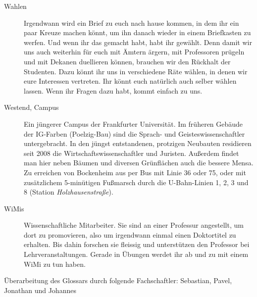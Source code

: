 \begin{description}
\item[Wahlen] Irgendwann wird ein Brief zu euch nach hause kommen, in dem ihr
ein paar Kreuze machen könnt, um ihn danach wieder in einem Briefkasten zu
werfen. Und wenn ihr das gemacht habt, habt ihr gewählt. Denn damit wir uns auch
weiterhin für euch mit Ämtern ärgern, mit Professoren prügeln und mit Dekanen
duellieren können, brauchen wir den Rückhalt der Studenten. Dazu könnt ihr uns
in verschiedene Räte wählen, in denen wir eure Interessen vertreten. Ihr könnt
euch natürlich auch selber wählen lassen. Wenn ihr Fragen dazu habt, kommt
einfach zu uns.




\item[Westend, Campus] Ein jüngerer Campus der Frankfurter
Universität. Im früheren Gebäude der IG-Farben (Poelzig-Bau) sind die
Sprach- und Geisteswissenschaftler untergebracht. In den jüngst
entstandenen, protzigen Neubauten residieren seit 2008 die
Wirtschaftswissenschaftler und Juristen. Außerdem findet man hier
neben Bäumen und diversen Grünflächen auch die bessere Mensa. Zu
erreichen von Bockenheim aus per Bus mit Linie 36 oder 75, oder mit
zusätzlichem 5-minütigen Fußmarsch durch die U-Bahn-Linien 1, 2, 3 und
8 (Station \textit{Holzhausenstraße}).


\item[WiMis] Wissenschaftliche Mitarbeiter. Sie sind an einer
Professur angestellt, um dort zu promovieren, also um irgendwann
einmal einen Doktortitel zu erhalten. Bis dahin forschen sie fleissig
und unterstützen den Professor bei Lehrveranstaltungen. Gerade in
Übungen werdet ihr ab und zu mit einem WiMi zu tun haben.

\end{description}

\begin{flushright}Überarbeitung des Glossars durch folgende Fachschaftler: Sebastian, 
Pavel, Jonathan und Johannes\end{flushright}

